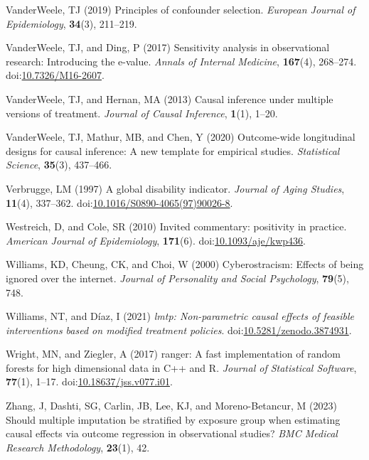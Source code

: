 \documentclass[
  single column]{article}
\newlength{\cslhangindent}
\newenvironment{CSLReferences}[2] %
 {\begin{list}{}{%
  \setlength{\itemindent}{0pt}
  \setlength{\leftmargin}{0pt}
  \setlength{\parsep}{0pt}
  \ifodd #1
   \setlength{\leftmargin}{\cslhangindent}
   \setlength{\itemindent}{-1\cslhangindent}
  \fi
  \setlength{\itemsep}{#2\baselineskip}}}
 {\end{list}}
\begin{document}
\begin{CSLReferences}{1}{0}
VanderWeele, TJ (2019) Principles of confounder selection.
\emph{European Journal of Epidemiology}, \textbf{34}(3), 211--219.

VanderWeele, TJ, and Ding, P (2017) Sensitivity analysis in
observational research: Introducing the e-value. \emph{Annals of
Internal Medicine}, \textbf{167}(4), 268--274.
doi:\href{https://doi.org/10.7326/M16-2607}{10.7326/M16-2607}.

VanderWeele, TJ, and Hernan, MA (2013) Causal inference under multiple
versions of treatment. \emph{Journal of Causal Inference},
\textbf{1}(1), 1--20.

VanderWeele, TJ, Mathur, MB, and Chen, Y (2020) Outcome-wide
longitudinal designs for causal inference: A new template for empirical
studies. \emph{Statistical Science}, \textbf{35}(3), 437--466.

Verbrugge, LM (1997) A global disability indicator. \emph{Journal of
Aging Studies}, \textbf{11}(4), 337--362.
doi:\href{https://doi.org/10.1016/S0890-4065(97)90026-8}{10.1016/S0890-4065(97)90026-8}.

Westreich, D, and Cole, SR (2010) Invited commentary: positivity in
practice. \emph{American Journal of Epidemiology}, \textbf{171}(6).
doi:\href{https://doi.org/10.1093/aje/kwp436}{10.1093/aje/kwp436}.

Williams, KD, Cheung, CK, and Choi, W (2000) Cyberostracism: Effects of
being ignored over the internet. \emph{Journal of Personality and Social
Psychology}, \textbf{79}(5), 748.

Williams, NT, and Díaz, I (2021) \emph{{l}mtp: Non-parametric causal
effects of feasible interventions based on modified treatment policies}.
doi:\href{https://doi.org/10.5281/zenodo.3874931}{10.5281/zenodo.3874931}.

Wright, MN, and Ziegler, A (2017) {ranger}: A fast implementation of
random forests for high dimensional data in {C++} and {R}. \emph{Journal
of Statistical Software}, \textbf{77}(1), 1--17.
doi:\href{https://doi.org/10.18637/jss.v077.i01}{10.18637/jss.v077.i01}.

Zhang, J, Dashti, SG, Carlin, JB, Lee, KJ, and Moreno-Betancur, M (2023)
Should multiple imputation be stratified by exposure group when
estimating causal effects via outcome regression in observational
studies? \emph{BMC Medical Research Methodology}, \textbf{23}(1), 42.

\end{CSLReferences}
\end{document}

